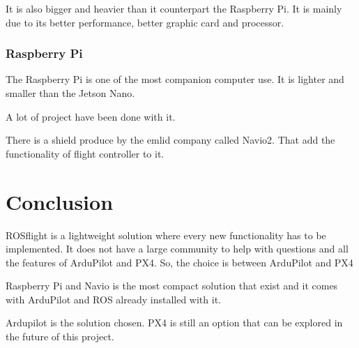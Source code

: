 It is also bigger and heavier than it counterpart the Raspberry Pi. It is mainly due to its better performance, better graphic card and processor.

\subsubsection{Raspberry Pi}
The Raspberry Pi is one of the most companion computer use. It is lighter and smaller than the Jetson Nano.

A lot of project have been done with it.

There is a shield produce by the emlid company called Navio2. That add the functionality of flight controller to it.

\section{Conclusion}
ROSflight is a lightweight solution where every new functionality has to be implemented.
It does not have a large community to help with questions and all the features of ArduPilot and PX4. So, the choice is between ArduPilot and PX4

Raspberry Pi and Navio is the most compact solution that exist and it comes with ArduPilot and ROS already installed with it.

Ardupilot is the solution chosen. PX4 is still an option that can be explored in the future of this project.
